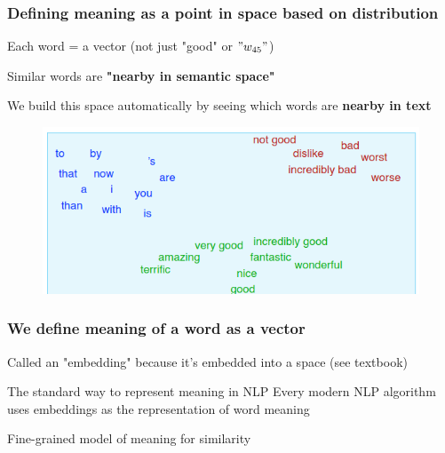 \documentclass[13.5pt,aspecratio=169, xcolor=dvipsnames]{beamer}
\begin{document}
\begin{frame}
    \onehalfspacing
        \frametitle{Defining meaning as a point in space based on distribution}
        {\Large
        Each word = a vector (not just "good" or $"w_{45}"$)

        \bigskip
        
        Similar words are \textbf{"nearby in semantic space"}

        \bigskip

        We build this space automatically by seeing which words are
        \textbf{nearby in text}
        \begin{figure}[h]
            \centering
            \includegraphics[width=0.8\linewidth]{word_vector.png}
        \end{figure}

        }
    \end{frame}

    \begin{frame}
        \onehalfspacing
            \frametitle{We define meaning of a word as a vector}
            {\Large
            Called an "embedding" because it's embedded into a
space (see textbook)
    
            \bigskip
            \begin{block}{The standard way to represent meaning in NLP}
                Every modern NLP algorithm uses embeddings as
the representation of word meaning
            \end{block} 

            \bigskip

            Fine-grained model of meaning for similarity
    
            }
        \end{frame}
\end{document}
